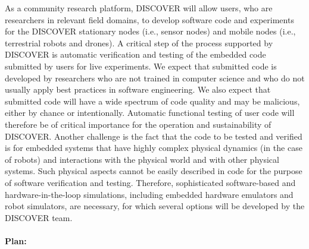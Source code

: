 As a community research platform, DISCOVER will allow users, who are researchers in relevant field domains, to develop software code and experiments for the DISCOVER stationary nodes (i.e., sensor nodes) and mobile nodes (i.e., terrestrial robots and drones).
A critical step of the process supported by DISCOVER is automatic verification and testing of the embedded code submitted by users for live experiments.
We expect that submitted code is developed by researchers who are not trained in computer science and who do not usually apply best practices in software engineering.
We also expect that submitted code will have a wide spectrum of code quality and may be malicious, either by chance or intentionally.
Automatic functional testing of user code will therefore be of critical importance for the operation and sustainability of DISCOVER.
Another challenge is the fact that the code to be tested and verified is for embedded systems that have highly complex physical dynamics (in the case of robots) and interactions with the physical world and with other physical systems.
Such physical aspects cannot be easily described in code for the purpose of software verification and testing.
Therefore, sophisticated software-based and hardware-in-the-loop simulations, including embedded hardware emulators and robot simulators, are necessary, for which several options will be developed by the DISCOVER team.

\paragraph{Plan:}

